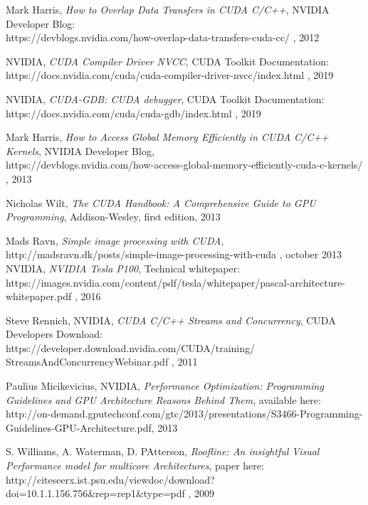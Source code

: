 \documentclass[12pt]{report}
\begin{document}
\begin{thebibliography}{9}
		Mark Harris, \textit{How to Overlap Data Transfers in CUDA C/C++}, NVIDIA Developer Blog:\\
		https://devblogs.nvidia.com/how-overlap-data-transfers-cuda-cc/ , 2012
		
		NVIDIA, \textit{CUDA Compiler Driver NVCC}, CUDA Toolkit Documentation:\\ 
		https://docs.nvidia.com/cuda/cuda-compiler-driver-nvcc/index.html , 2019
		
		NVIDIA, \textit{CUDA-GDB: CUDA debugger}, CUDA Toolkit Documentation:\\ 
		https://docs.nvidia.com/cuda/cuda-gdb/index.html , 2019
		
		Mark Harris, \textit{How to Access Global Memory Efficiently in CUDA C/C++ Kernels}, NVIDIA Developer Blog,\\ https://devblogs.nvidia.com/how-access-global-memory-efficiently-cuda-c-kernels/ , 2013
		
		Nicholas Wilt, \textit{The CUDA Handbook: A Comprehensive Guide to GPU Programming}, Addison-Wesley, first edition, 2013
		
		Mads Ravn, \textit{Simple image processing with CUDA}, http://madsravn.dk/posts/simple-image-processing-with-cuda , october 2013
		NVIDIA, \textit{NVIDIA Tesla P100}, Technical whitepaper:\\
		https://images.nvidia.com/content/pdf/tesla/whitepaper/pascal-architecture-whitepaper.pdf , 2016
		
		
		Steve Rennich, NVIDIA, \textit{CUDA C/C++ Streams and Concurrency}, CUDA Developers Download:\\
		https://developer.download.nvidia.com/CUDA/training/\\
		StreamsAndConcurrencyWebinar.pdf , 2011
		
		
		Paulius Micikevicius, NVIDIA, \textit{Performance Optimization: Programming Guidelines and GPU Architecture Reasons Behind Them}, available here:\\
		http://on-demand.gputechconf.com/gtc/2013/presentations/S3466-Programming-Guidelines-GPU-Architecture.pdf, 2013
		
		S. Williams, A. Waterman, D. PAtterson, \textit{Roofline:  An insightful Visual Performance model for multicore Architectures}, paper here:\\
		http://citeseerx.ist.psu.edu/viewdoc/download?doi=10.1.1.156.756\&rep=rep1\&type=pdf , 2009
		

\end{thebibliography}
\end{document}
